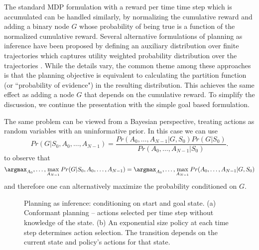 The standard MDP formulation with a reward per time time step which is accumulated can be handled similarly, by normalizing the cumulative reward and adding a binary node $G$ whose probability of being true is a function of the normalized cumulative reward. Several alternative formulations of planning as inference have been proposed by defining an auxiliary distribution over finite trajectories which captures utility weighted probability distribution over the trajectories \cite{ToussaintSt06,FurmstonB10,LiuI12,ChengLCI13,MeentPTW16}. While the details vary, the common theme among these approaches is that the planning objective is equivalent to calculating the partition function (or ``probability of evidence") in the resulting distribution. 
This achieves the same effect as adding a node $G$ that depends on the cumulative reward.
To simplify the discussion, we continue the presentation with the simple goal based formulation. 


The same problem can be viewed from a Bayesian perspective, treating actions as random variables with an uninformative prior. In this case we can use
\[
Pr(G | S_0, A_0, \ldots, A_{N-1}) = 
\frac
{Pr(A_0, \ldots, A_{N-1}| G, S_0 ) Pr(G | S_0)}{Pr(A_0, \ldots, A_{N-1}|  S_0)}.
\]
to observe that  \cite{Attias03,ToussaintSt06,LangTo09}
\[
\argmax_{A_0}, \ldots, \max_{A_{N-1}}  Pr(G | S_0, A_0, \ldots, A_{N-1}) = \argmax_{A_0}, \ldots, \max_{A_{N-1}}  Pr(A_0, \ldots, A_{N-1}| G, S_0 )
\]
and therefore one can alternatively maximize the probability conditioned on $G$.


\begin{figure*}
\begin{center}
%
\end{center}
\caption{Planning as inference: conditioning on start and goal state.
(a) Conformant planning -- actions selected per time step without knowledge of the state.
(b) An exponential size policy at each time step determines action selection. The transition depends on the current state and policy's actions for that state.
%
%
}
\label{fig:PasI}
\end{figure*}

